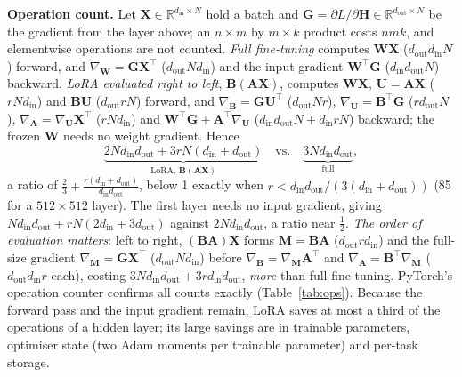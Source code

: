 \documentclass{article}
\theoremstyle{plain}
\newcommand{\R}{\mathbb{R}}
\newcommand{\X}{\mathbf{X}}
\newcommand{\W}{\mathbf{W}}
\newcommand{\A}{\mathbf{A}}
\newcommand{\B}{\mathbf{B}}
\newcommand{\G}{\mathbf{G}}
\newcommand{\U}{\mathbf{U}}
\newcommand{\din}{d_{\mathrm{in}}}
\newcommand{\dout}{d_{\mathrm{out}}}
\begin{document}
\textbf{Operation count.} Let $\X\in\R^{\din\times N}$ hold a batch and $\G=\partial L/\partial\mathbf H\in\R^{\dout\times N}$ be the gradient from the layer above; an $n\times m$ by $m\times k$ product costs $nmk$, and elementwise operations are not counted. \emph{Full fine-tuning} computes $\W\X$ ($\dout\din N$) forward, and $\nabla_\W=\G\X^\top$ ($\dout N\din$) and the input gradient $\W^\top\G$ ($\din\dout N$) backward. \emph{LoRA evaluated right to left}, $\B(\A\X)$, computes $\W\X$, $\U=\A\X$ ($rN\din$) and $\B\U$ ($\dout rN$) forward, and $\nabla_\B=\G\U^\top$ ($\dout Nr$), $\nabla_\U=\B^\top\G$ ($r\dout N$), $\nabla_\A=\nabla_\U\X^\top$ ($rN\din$) and $\W^\top\G+\A^\top\nabla_\U$ ($\din\dout N+\din rN$) backward; the frozen $\W$ needs no weight gradient. Hence
\begin{equation}
\underbrace{2N\din\dout+3rN(\din+\dout)}_{\text{LoRA, }\B(\A\X)}\quad\text{vs.}\quad \underbrace{3N\din\dout}_{\text{full}} ,
\label{eq:ops}
\end{equation}
a ratio of $\frac23+\frac{r(\din+\dout)}{\din\dout}$, below 1 exactly when $r<\din\dout/(3(\din+\dout))$ (85 for a $512\times512$ layer). The first layer needs no input gradient, giving $N\din\dout+rN(2\din+3\dout)$ against $2N\din\dout$, a ratio near $\frac12$. \emph{The order of evaluation matters}: left to right, $(\B\A)\X$ forms $\mathbf M=\B\A$ ($\dout r\din$) and the full-size gradient $\nabla_{\mathbf M}=\G\X^\top$ ($\dout N\din$) before $\nabla_\B=\nabla_{\mathbf M}\A^\top$ and $\nabla_\A=\B^\top\nabla_{\mathbf M}$ ($\dout\din r$ each), costing $3N\din\dout+3r\din\dout$, \emph{more} than full fine-tuning. PyTorch's operation counter confirms all counts exactly (Table~\ref{tab:ops}). Because the forward pass and the input gradient remain, LoRA saves at most a third of the operations of a hidden layer; its large savings are in trainable parameters, optimiser state (two Adam moments per trainable parameter) and per-task storage.

\begin{table}[t]
\caption{Operations ($\times10^6$) of one training step with batch $N=64$, measured with PyTorch's \texttt{FlopCounterMode} (equal to Eq.~\ref{eq:ops} and its variants), and trainable parameters.}
\label{tab:ops}
\vskip 0.05in
\begin{center}
\setlength{\tabcolsep}{4pt}

\end{center}
\vskip -0.2in
\end{table}
\end{document}
